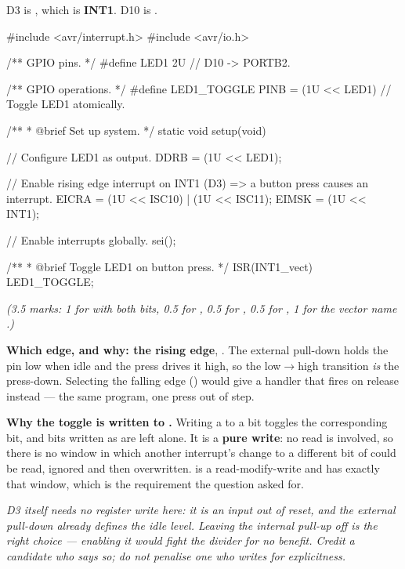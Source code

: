 
D3 is , which is \textbf{INT1}. D10 is .

\begin{ccode}
#include <avr/interrupt.h>
#include <avr/io.h>

/** GPIO pins. */
#define LED1 2U // D10 -> PORTB2.

/** GPIO operations. */
#define LED1_TOGGLE PINB = (1U << LED1) // Toggle LED1 atomically.

/**
 * @brief Set up system.
 */
static void setup(void)
{
    // Configure LED1 as output.
    DDRB = (1U << LED1);

    // Enable rising edge interrupt on INT1 (D3) => a button press causes an interrupt.
    EICRA = (1U << ISC10) | (1U << ISC11);
    EIMSK = (1U << INT1);

    // Enable interrupts globally.
    sei();
}

/**
 * @brief Toggle LED1 on button press.
 */
ISR(INT1_vect) { LED1_TOGGLE; }
\end{ccode}

{\itshape (3.5 marks: 1 for  with both  bits, 0.5 for , 0.5 for
, 0.5 for , 1 for the vector name .)\par}

\medskip
\textbf{Which edge, and why: the rising edge}, . The external pull-down holds
the pin low when idle and the press drives it high, so the low$\rightarrow$high transition \emph{is}
the press-down. Selecting the falling edge () would give a handler that fires on release
instead --- the same program, one press out of step. 

\textbf{Why the toggle is written to .} Writing a  to a  bit toggles
the corresponding  bit, and bits written as  are left alone. It is a
\textbf{pure write}: no read is involved, so there is no window in which another interrupt's change
to a different bit of  could be read, ignored and then overwritten.
 is a read-modify-write and has exactly that window, which is the
requirement the question asked for. 

{\itshape D3 itself needs no register write here: it is an input out of reset, and the external
pull-down already defines the idle level. Leaving the internal pull-up off is the right choice ---
enabling it would fight the divider for no benefit. Credit a candidate who says so; do not penalise
one who writes  for explicitness.\par}

